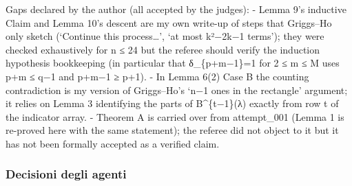\documentclass[11pt,a4paper]{article}
\begin{document}
Gaps declared by the author (all accepted by the judges): - Lemma 9's
inductive Claim and Lemma 10's descent are my own write-up of steps that
Griggs--Ho only sketch (`Continue this process\ldots{}', `at most
k²−2k−1 terms'); they were checked exhaustively for n ≤ 24 but the
referee should verify the induction hypothesis bookkeeping (in
particular that δ\_\{p+m−1\}=1 for 2 ≤ m ≤ M uses p+m ≤ q−1 and p+m−1 ≥
p+1). - In Lemma 6(2) Case B the counting contradiction is my version of
Griggs--Ho's `n−1 ones in the rectangle' argument; it relies on Lemma 3
identifying the parts of B\^{}\{t−1\}(λ) exactly from row t of the
indicator array. - Theorem A is carried over from attempt\_001 (Lemma 1
is re-proved here with the same statement); the referee did not object
to it but it has not been formally accepted as a verified claim.

\subsubsection{Decisioni degli agenti}
\end{document}
